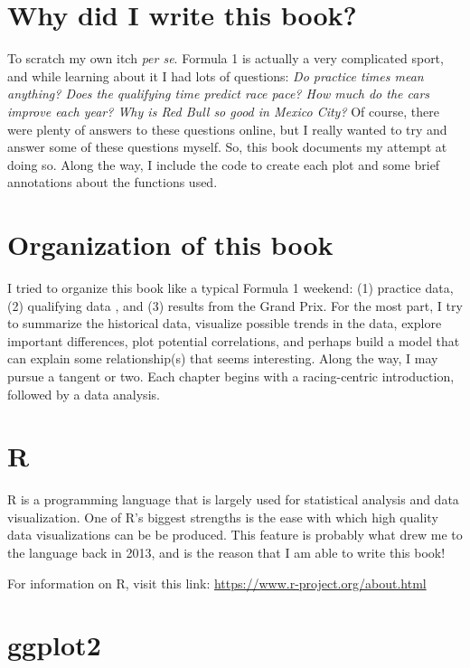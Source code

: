 \documentclass[
]{book}
\begin{document}
\hypertarget{why-did-i-write-this-book}{%
\section{Why did I write this book?}\label{why-did-i-write-this-book}}

To scratch my own itch \emph{per se}. Formula 1 is actually a very complicated sport, and while learning about it I had lots of questions: \emph{Do practice times mean anything? Does the qualifying time predict race pace? How much do the cars improve each year? Why is Red Bull so good in Mexico City?} Of course, there were plenty of answers to these questions online, but I really wanted to try and answer some of these questions myself. So, this book documents my attempt at doing so. Along the way, I include the code to create each plot and some brief annotations about the functions used.

\hypertarget{organization-of-this-book}{%
\section{Organization of this book}\label{organization-of-this-book}}

I tried to organize this book like a typical Formula 1 weekend: (1) practice data, (2) qualifying data , and (3) results from the Grand Prix. For the most part, I try to summarize the historical data, visualize possible trends in the data, explore important differences, plot potential correlations, and perhaps build a model that can explain some relationship(s) that seems interesting. Along the way, I may pursue a tangent or two. Each chapter begins with a racing-centric introduction, followed by a data analysis.

\hypertarget{r}{%
\section{R}\label{r}}

R is a programming language that is largely used for statistical analysis and data visualization. One of R's biggest strengths is the ease with which high quality data visualizations can be be produced. This feature is probably what drew me to the language back in 2013, and is the reason that I am able to write this book!

For information on R, visit this link: \url{https://www.r-project.org/about.html}

\hypertarget{ggplot2}{%
\section{ggplot2}\label{ggplot2}}
\end{document}
